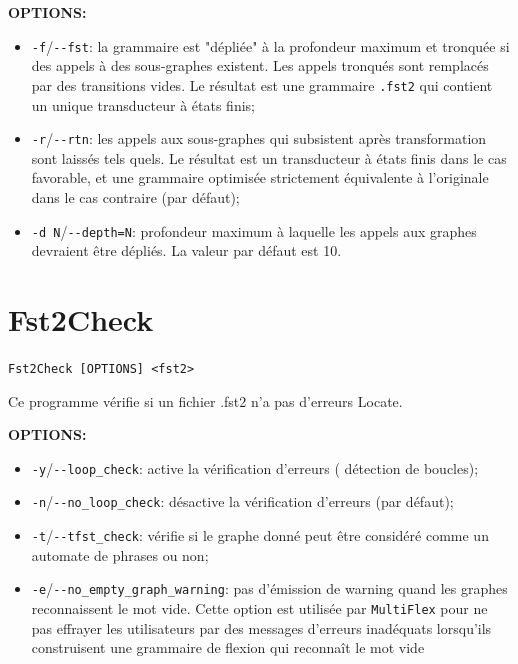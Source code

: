 \bigskip
\noindent \textbf{OPTIONS:}
\begin{itemize}
\item \verb+-f+/\verb+--fst+: la grammaire est "dépliée" à la profondeur maximum et tronquée si des
	appels à des sous-graphes existent. Les appels tronqués sont remplacés par des transitions
	vides. Le résultat est une grammaire \verb+.fst2+ qui contient un unique transducteur à
	états finis;

\item \verb+-r+/\verb+--rtn+: les appels aux sous-graphes qui subsistent après transformation sont
	laissés tels quels. Le résultat est un transducteur à états finis dans le cas favorable, et
	une grammaire optimisée strictement équivalente à l'originale dans le cas contraire (par
		défaut);

\item \verb+-d N+/\verb+--depth=N+: profondeur maximum à laquelle les appels aux graphes devraient
	être dépliés. La valeur par défaut est 10.
\end{itemize}







\section{Fst2Check}
\verb+Fst2Check [OPTIONS] <fst2>+

\bigskip
\noindent Ce programme vérifie si un fichier .fst2 n'a pas d'erreurs Locate.

\bigskip
\noindent \textbf{OPTIONS:}
\begin{itemize}
\item \verb+-y+/\verb+--loop_check+: active la vérification d'erreurs (
		détection de boucles);
\item \verb+-n+/\verb+--no_loop_check+: désactive la vérification d'erreurs (par défaut);
\item \verb+-t+/\verb+--tfst_check+: vérifie si le  graphe donné peut être considéré comme un
	automate de phrases ou non;
\item \verb+-e+/\verb+--no_empty_graph_warning+: pas d'émission de warning 
	quand les graphes reconnaissent le mot vide. Cette option est utilisée par \verb+MultiFlex+
	pour ne pas effrayer les utilisateurs par des messages d'erreurs inadéquats lorsqu'ils
	construisent une grammaire de flexion qui reconnaît le mot vide
\end{itemize}

